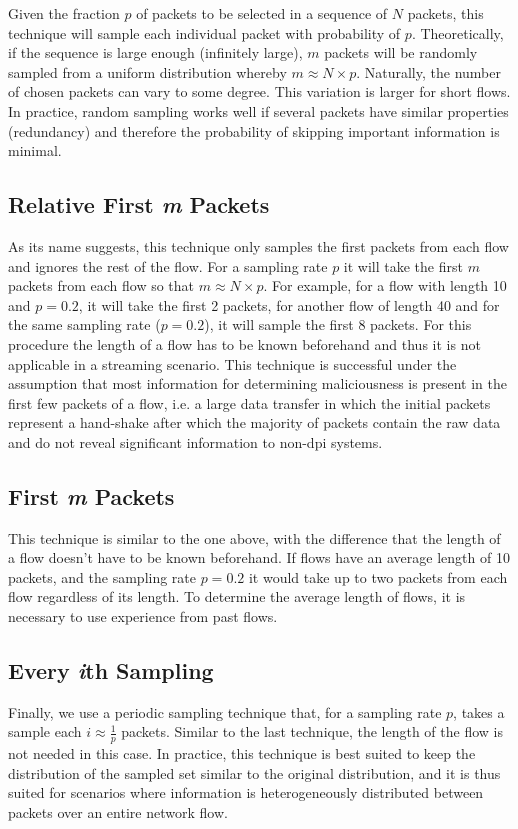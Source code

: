 \documentclass[conference]{IEEEtran}
\begin{document}
Given the fraction $p$ of packets to be selected in a sequence of $N$ packets, this technique will sample each individual packet with probability of $p$. Theoretically, if the sequence is large enough (infinitely large), $m$ packets will be randomly sampled from a uniform distribution whereby $m \approx N \times p$. Naturally, the number of chosen packets can vary to some degree. This variation is larger for short flows. In practice, random sampling works well if several packets have similar properties (redundancy) and therefore the probability of skipping important information is minimal.

\subsection{Relative First \emph{m} Packets}
As its name suggests, this technique only samples the first packets from each flow and ignores the rest of the flow. For a sampling rate $p$ it will take the first $m$ packets from each flow so that $m \approx N \times p$. For example, for a flow with length 10 and $p=0.2$, it will take the first 2 packets, for another flow of length 40 and for the same sampling rate ($p=0.2$), it will sample the first 8 packets. For this procedure the length of a flow has to be known beforehand and thus it is not applicable in a streaming scenario. This technique is successful under the assumption that most information for determining maliciousness is present in the first few packets of a flow, i.e. a large data transfer in which the initial packets represent a hand-shake after which the majority of packets contain the raw data and do not reveal significant information to non-\gls{dpi} systems.

\subsection{First \emph{m} Packets}
This technique is similar to the one above, with the difference that the length of a flow doesn't have to be known beforehand. If flows have an average length of 10 packets, and the sampling rate $p=0.2$ it would take up to two packets from each flow regardless of its length. To determine the average length of flows, it is necessary to use experience from past flows. 

\subsection{Every \emph{i}th Sampling}
Finally, we use a periodic sampling technique that, for a sampling rate $p$, takes a sample each $i \approx \frac{1}{p} $ packets. Similar to the last technique, the length of the flow is not needed in this case. In practice, this technique is best suited to keep the distribution of the sampled set similar to the original distribution, and it is thus suited for scenarios where information is heterogeneously distributed between packets over an entire network flow.
\end{document}
